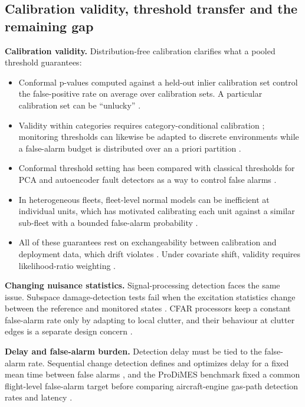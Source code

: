 \documentclass[preprint,11pt,a4paper]{elsarticle}
\begin{document}
\subsection{Calibration validity, threshold transfer and the remaining gap}

\textbf{Calibration validity.} Distribution-free calibration clarifies what a pooled threshold guarantees:
\begin{itemize}
\item Conformal p-values computed against a held-out inlier calibration set control the false-positive rate on average over calibration sets. A particular calibration set can be ``unlucky'' \cite{N16}.
\item Validity within categories requires category-conditional calibration \cite{N7}; monitoring thresholds can likewise be adapted to discrete environments while a false-alarm budget is distributed over an a priori partition \cite{N45}.
\item Conformal threshold setting has been compared with classical thresholds for PCA and autoencoder fault detectors as a way to control false alarms \cite{N41}.
\item In heterogeneous fleets, fleet-level normal models can be inefficient at individual units, which has motivated calibrating each unit against a similar sub-fleet with a bounded false-alarm probability \cite{N44}.
\item All of these guarantees rest on exchangeability between calibration and deployment data, which drift violates \cite{N20}. Under covariate shift, validity requires likelihood-ratio weighting \cite{N30}.
\end{itemize}

\textbf{Changing nuisance statistics.} Signal-processing detection faces the same issue. Subspace damage-detection tests fail when the excitation statistics change between the reference and monitored states \cite{N15}. CFAR processors keep a constant false-alarm rate only by adapting to local clutter, and their behaviour at clutter edges is a separate design concern \cite{N10}.

\textbf{Delay and false-alarm burden.} Detection delay must be tied to the false-alarm rate. Sequential change detection defines and optimizes delay for a fixed mean time between false alarms \cite{N17}, and the ProDiMES benchmark fixed a common flight-level false-alarm target before comparing aircraft-engine gas-path detection rates and latency \cite{N24}.
\end{document}
